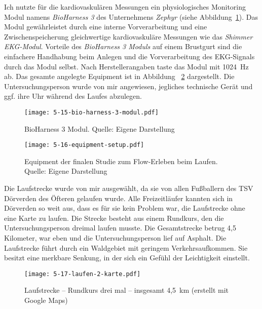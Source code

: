 Ich nutzte für die kardiovaskulären Messungen ein physiologisches Monitoring Modul namens \emph{BioHarness 3} des Unternehmens \emph{Zephyr} (siehe Abbildung~\ref{fig:5_15_bio_harness_3_modul}). Das Modul gewährleistet durch eine interne Vorverarbeitung und eine Zwischenspeicherung gleichwertige kardiovaskuläre Messungen wie das \emph{Shimmer EKG-Modul}. Vorteile des \emph{BioHarness 3 Moduls} auf einem Brustgurt sind die einfachere Handhabung beim Anlegen und die Vorverarbeitung des \ac{EKG}-Signals durch das Modul selbst. Nach Herstellerangaben taste das Modul mit 1024~Hz ab. Das gesamte angelegte Equipment ist in Abbildung ~\ref{fig:5_16_equipment_setup} dargestellt. Die Untersuchungsperson wurde von mir angewiesen, jegliches technische Gerät und ggf. ihre Uhr während des Laufes abzulegen.

\begin{figure}[t]
	\centering
		\texttt{[image: 5-15-bio-harness-3-modul.pdf]}
	\caption[BioHarness 3 Modul]{BioHarness 3 Modul. Quelle: Eigene Darstellung}
	\label{fig:5_15_bio_harness_3_modul}
\end{figure}

\begin{figure}[t]
	\centering
		\texttt{[image: 5-16-equipment-setup.pdf]}
	\caption[Equipment der finalen Studie zum Flow-Erleben beim Laufen]{Equipment der finalen Studie zum Flow-Erleben beim Laufen. Quelle: Eigene Darstellung}
	\label{fig:5_16_equipment_setup}
\end{figure}

Die Laufstrecke wurde von mir ausgewählt, da sie von allen Fußballern des TSV Dörverden des Öfteren gelaufen wurde. Alle Freizeitläufer kannten sich in Dörverden so weit aus, dass es für sie kein Problem war, die Laufstrecke ohne eine Karte zu laufen. Die Strecke besteht aus einem Rundkurs, den die Untersuchungsperson dreimal laufen musste. Die Gesamtstrecke betrug 4,5 Kilometer, war eben und die Untersuchungsperson lief auf Asphalt. Die Laufstrecke führt durch ein Waldgebiet mit geringem Verkehrsaufkommen. Sie besitzt eine merkbare Senkung, in der sich ein Gefühl der Leichtigkeit einstellt. 

\begin{figure}[t]
	\centering
		\texttt{[image: 5-17-laufen-2-karte.pdf]}
	\caption[Laufstrecke -- Rundkurs]{Laufstrecke -- Rundkurs drei mal -- insgesamt 4,5~km (erstellt mit Google Maps)}
	\label{fig:5_17_laufen_2_karte}
\end{figure}


